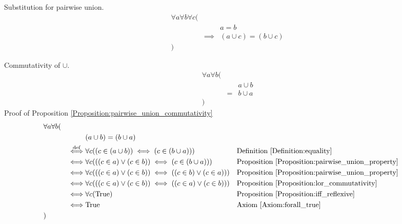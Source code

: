 \begin{prop}
\label{Proposition:substitution_of_pairwise_union}
Substitution for pairwise union.
\begin{align*}
& \forall a \forall b \forall c ( \\
& & & a = b \\
& & \implies & (a \cup c) = (b \cup c) \\
& )
\end{align*}
\end{prop}

\begin{prop}
\label{Proposition:pairwise_union_commutativity}
Commutativity of $\cup$.
\begin{align*}
& \forall a \forall b ( \\
& & & a \cup b \\
& & = & b \cup a \\
& )
\end{align*}
Proof of Proposition \ref{Proposition:pairwise_union_commutativity}
\begin{align*}
& \forall a \forall b ( \\
& & & (a \cup b) = (b \cup a) \\
& & \overset{\operatorname{def}}{\iff} & \forall c ((c \in (a \cup b)) \iff (c \in (b \cup a)))
& & \text{Definition \ref{Definition:equality}} \\
& & \iff & \forall c (((c \in a) \lor (c \in b)) \iff (c \in (b \cup a)))
& & \text{Proposition \ref{Proposition:pairwise_union_property}} \\
& & \iff & \forall c (((c \in a) \lor (c \in b)) \iff ((c \in b) \lor (c \in a)))
& & \text{Proposition \ref{Proposition:pairwise_union_property}} \\
& & \iff & \forall c (((c \in a) \lor (c \in b)) \iff ((c \in a) \lor (c \in b)))
& & \text{Proposition \ref{Proposition:lor_commutativity}} \\
& & \iff & \forall c (\text{True})
& & \text{Proposition \ref{Proposition:iff_reflexive}} \\
& & \iff & \text{True}
& & \text{Axiom \ref{Axiom:forall_true}} \\
& )
\end{align*}
\end{prop}

